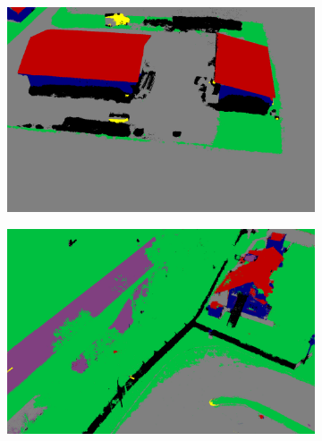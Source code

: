 \documentclass[remotesensing,article,accept,moreauthors,pdftex,10pt,a4paper]{mdpi}
\theoremstyle{mdpi}
\newcounter{ex}
\newcounter{re}
\begin{document}
\begin{figure}[H]
\begin{subfigure}[tbp]{0.24\columnwidth}
           \caption[]{}
           {{\small }}    
           \label{fig:4e}
       \end{subfigure}       
       \begin{subfigure}[tbp]{0.24\columnwidth}  
           \centering 
           \includegraphics[width=\textwidth]{segment/fin_seg2.png}
           \caption[]{}%
           {{\small }}    
           \label{fig:4f}
       \end{subfigure}
       \hfill
       \begin{subfigure}[tbp]{0.24\columnwidth}  
           \centering 
           \includegraphics[width=\textwidth]{segment/kiga_seg1.png}
           \caption[]{}
           {{\small }}    
           \label{fig:4g}
       \end{subfigure}       
       \begin{subfigure}[tbp]{0.24\columnwidth}  
           \centering 

\end{subfigure}
\end{figure}
\end{document}
